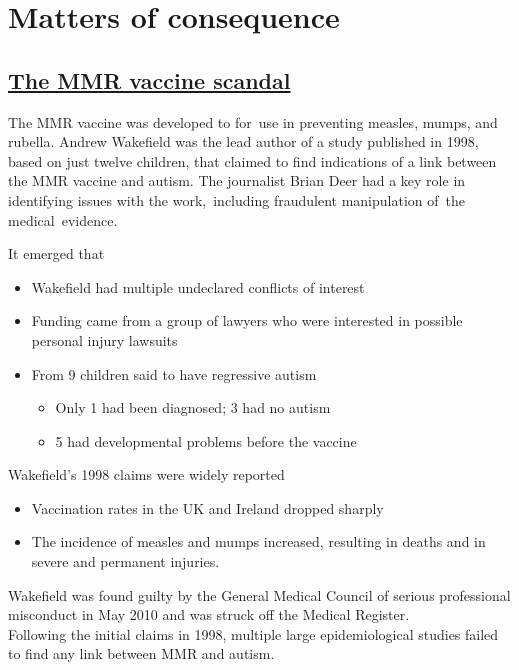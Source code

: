 \documentclass[
  10ptls,
  b5paper]{book}
\providecommand{\tightlist}{%
  \setlength{\itemsep}{0pt}\setlength{\parskip}{0pt}}
\begin{document}
\chapter{Matters of consequence}\label{matters-of-consequence}

\section{\texorpdfstring{\href{https://en.wikipedia.org/wiki/MMR_vaccine_controversy}{The MMR vaccine scandal}}{The MMR vaccine scandal}}\label{the-mmr-vaccine-scandal}

The MMR vaccine was developed to for~use in preventing measles, mumps, and rubella. Andrew Wakefield was the lead author of a study published in 1998, based on just twelve children, that claimed to find indications of a link between the MMR vaccine and autism. The journalist Brian Deer had a key role in identifying issues with the work,~including fraudulent manipulation of~the medical~evidence.

It emerged that

\begin{itemize}
\tightlist
\item
  Wakefield had multiple undeclared conflicts of interest
\item
  Funding came from a group of lawyers who were interested in possible personal injury lawsuits
\item
  From 9 children said to have regressive autism

  \begin{itemize}
  \tightlist
  \item
    Only 1 had been diagnosed; 3 had no autism
  \item
    5 had developmental problems before the vaccine
  \end{itemize}
\end{itemize}

Wakefield's 1998 claims were widely reported

\begin{itemize}
\tightlist
\item
  Vaccination rates in the UK and Ireland dropped sharply
\item
  The incidence of measles and mumps increased, resulting in deaths and in severe and permanent injuries.
\end{itemize}

Wakefield was found guilty by the General Medical Council of serious professional misconduct in May 2010 and was struck off the Medical Register.\\
Following the initial claims in 1998, multiple large epidemiological studies failed to find any link between MMR and autism.
\end{document}
